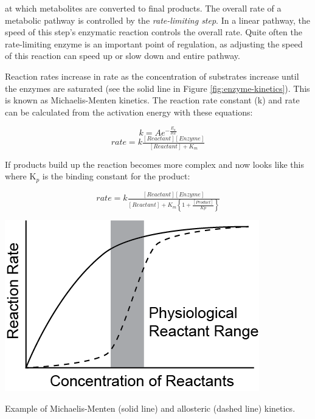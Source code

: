 \documentclass{tufte-handout}
\begin{document}
 at which metabolites are converted to final products. The overall rate of a metabolic pathway is controlled by the \emph{rate-limiting step}.  In a linear pathway, the speed of this step's enzymatic reaction controls the overall rate.  Quite often the rate-limiting enzyme is an important point of regulation, as adjusting the speed of this reaction can speed up or slow down and entire pathway.  

Reaction rates increase in rate as the concentration of substrates increase until the enzymes are saturated (see the solid line in Figure \ref{fig:enzyme-kinetics}).  This is known as Michaelis-Menten kinetics.  The reaction rate constant (k) and rate can be calculated from the activation energy with these equations:

\begin{equation}
k = A e^{-\frac{E_{a}}{RT}} 
\end{equation}
\begin{equation}
rate = k\tfrac{[Reactant][Enzyme]}{[Reactant] + K_{m}}
\end{equation}

If products build up the reaction becomes more complex and now looks like this where K$_{p}$ is the binding constant for the product:

\begin{equation}
rate = k\tfrac{[Reactant][Enzyme]}{[Reactant] +K_{m}\left \{ 1 + \frac{[Product]}{Kp} \right \}}
\end{equation}

\begin{marginfigure}
\includegraphics[width=\marginparwidth]{figures/enzyme-kinetics.png}\
\caption{Example of Michaelis-Menten (solid line) and allosteric (dashed line) kinetics.}
\label{fig:enzyme-kinetics}
\end{marginfigure}
\end{document}
